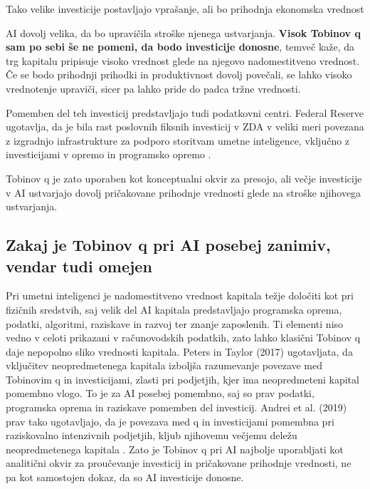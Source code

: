 \documentclass[12pt,a4paper]{article}
\begin{document}
Tako velike investicije postavljajo vprašanje, ali bo prihodnja ekonomska vrednost 

AI dovolj velika, da bo upravičila stroške njenega ustvarjanja. \textbf{Visok Tobinov q sam po sebi še ne pomeni, da bodo investicije donosne}, temveč kaže, da trg kapitalu 
pripisuje visoko vrednost glede na njegovo nadomestitveno vrednost. Če se bodo prihodnji 
prihodki in produktivnost dovolj povečali, se lahko visoko vrednotenje upraviči, sicer pa 
lahko pride do padca tržne vrednosti.

Pomemben del teh investicij predstavljajo tudi podatkovni centri. Federal Reserve 
ugotavlja, da je bila rast poslovnih fiksnih investicij v ZDA v veliki meri povezana 
z izgradnjo infrastrukture za podporo storitvam umetne inteligence, vključno z 
investicijami v opremo in programsko opremo \citep{FederalReserve2026}.

Tobinov q je zato uporaben kot konceptualni okvir za presojo, ali večje investicije v 
AI ustvarjajo dovolj pričakovane prihodnje vrednosti glede na stroške njihovega 
ustvarjanja.


\subsection{Zakaj je Tobinov q pri AI posebej zanimiv, vendar tudi omejen}


Pri umetni inteligenci je nadomestitveno vrednost kapitala težje določiti kot pri fizičnih 
sredstvih, saj velik del AI kapitala predstavljajo programska oprema, podatki, algoritmi, 
raziskave in razvoj ter znanje zaposlenih. Ti elementi niso vedno v celoti prikazani v računovodskih 
podatkih, zato lahko klasični Tobinov q daje nepopolno sliko vrednosti kapitala.
Peters in Taylor (2017) ugotavljata, da vključitev neopredmetenega kapitala izboljša \citep{PetersTaylor2016} 
razumevanje povezave med Tobinovim q in investicijami, zlasti pri podjetjih, kjer ima 
neopredmeteni kapital pomembno vlogo. To je za AI posebej pomembno, saj so prav podatki, 
programska oprema in raziskave pomemben del investicij. Andrei et al. (2019) prav tako 
ugotavljajo, da je povezava med q in investicijami pomembna pri raziskovalno intenzivnih 
podjetjih, kljub njihovemu večjemu deležu neopredmetenega kapitala \citep{AndreiMannMoyen2017}.
Zato je Tobinov q pri AI najbolje uporabljati kot analitični okvir za proučevanje 
investicij in pričakovane prihodnje vrednosti, ne pa kot samostojen dokaz, da so AI 
investicije donosne.
\end{document}
